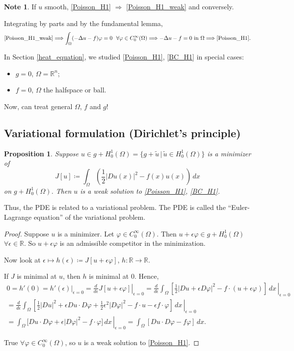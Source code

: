 \documentclass[12pt]{article}
\newtheorem{proposition}{Proposition}[section]
\theoremstyle{definition}
\newtheorem*{note}{Note}
\begin{document}
\begin{note}
If $u$ smooth, \eqref{Poisson_H1} $\Rightarrow$ \eqref{Poisson_H1_weak} and conversely.

Integrating by parts and by the fundamental lemma,
\[\text{\eqref{Poisson_H1_weak}}\Longrightarrow\int_\Omega(-\Delta u-f)\varphi=0\ \ \forall\varphi\in C_0^\infty(\Omega)\Longrightarrow-\Delta u-f=0\text{ in }\Omega\Longrightarrow\text{\eqref{Poisson_H1}}.\]
\end{note}

In Section \ref{heat_equation}, we studied \eqref{Poisson_H1}, \eqref{BC_H1} in special cases:
\begin{itemize}
\item $g=0$, $\Omega=\mathbb R^n$;
\item $f=0$, $\Omega$ the halfspace or ball.
\end{itemize}
Now, can treat general $\Omega$, $f$ and $g$!

\subsection{Variational formulation (Dirichlet's principle)}

\begin{proposition}\label{solution_minimizer}
Suppose $u\in g+H_0^1(\Omega)=\{g+\tilde u\,|\,\tilde u\in H_0^1(\Omega)\}$ is a minimizer of
\[J[u]\coloneqq\int_\Omega\left(\frac12\big|Du(x)\big|^2-f(x)u(x)\right)\,dx\]
on $g+H_0^1(\Omega)$. Then $u$ is a weak solution to \eqref{Poisson_H1}, \eqref{BC_H1}.
\end{proposition}

Thus, the PDE is related to a variational problem. The PDE is called the ``Euler-Lagrange equation'' of the variational problem.

\begin{proof}
Suppose $u$ is a minimizer. Let $\varphi\in C_0^\infty(\Omega)$. Then $u+\epsilon\varphi\in g+H_0^1(\Omega)$ $\forall\epsilon\in\mathbb R$. So $u+\epsilon\varphi$ is an admissible competitor in the minimization.

Now look at $\epsilon\mapsto h(\epsilon)\coloneqq J[u+\epsilon\varphi]$, $h:\mathbb R\rightarrow\mathbb R$.

If $J$ is minimal at $u$, then $h$ is minimal at $0$. Hence,
\begin{multline*}
0=h'(0)=h'(\epsilon)|_{\epsilon=0}=\left.\frac d{d\epsilon}J[u+\epsilon\varphi]\right|_{\epsilon=0}=\left.\frac d{d\epsilon}\int_\Omega\left[\frac12|Du+\epsilon D\varphi|^2-f\cdot(u+\epsilon\varphi)\right]\,dx\,\right|_{\epsilon=0}\\
=\left.\frac d{d\epsilon}\int_\Omega\left[\frac12|Du|^2+\epsilon Du\cdot D\varphi+\frac12\epsilon^2|D\varphi|^2-f\cdot u-\epsilon f\cdot\varphi\right]\,dx\,\right|_{\epsilon=0}\\
=\left.\int_\Omega\big[Du\cdot D\varphi+\epsilon|D\varphi|^2-f\cdot\varphi\big]\,dx\,\right|_{\epsilon=0}=\int_\Omega[Du\cdot D\varphi-f\varphi]\,dx.
\end{multline*}

True $\forall\varphi\in C_0^\infty(\Omega)$, so $u$ is a weak solution to \eqref{Poisson_H1}.
\end{proof}
\end{document}
